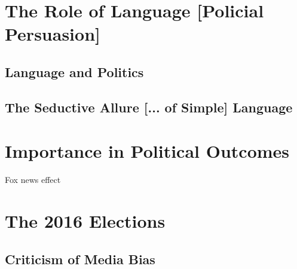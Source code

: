  









\section{The Role of Language [Policial Persuasion]}




\subsection{Language and Politics}
\subsection{The Seductive Allure [... of Simple] Language}




\section{Importance in Political Outcomes}
Fox news effect 

\section{The 2016 Elections} 
\subsection{Criticism of Media Bias} 









